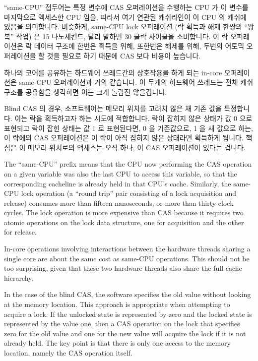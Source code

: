 ``same-CPU'' 접두어는 특정 변수에 CAS 오퍼레이션을 수행하는 CPU 가 이 변수를
마지막으로 액세스한 CPU 임을, 따라서 여기 연관된 캐쉬라인이 이 CPU 의 캐쉬에
있음을 의미합니다.
비슷하게, same-CPU lock 오퍼레이션 (락 획득과 해제 한쌍의 ``왕복'' 작업) 은 15
나노세컨드, 달리 말하면 30 클락 사이클을 소비합니다.
이 락 오퍼레이션은 락 데이터 구조에 한번은 획득을 위해, 또한번은 해제를 위해,
두번의 어토믹 오퍼레이션을 할 것을 필요로 하기 때문에 CAS 보다 비용이 높습니다.

하나의 코어를 공유하는 하드웨어 쓰레드간의 상호작용을 하게 되는 in-core
오퍼레이션은 same-CPU 오퍼레이션과 거의 같습니다.
이 두개의 하드웨어 쓰레드는 전체 캐쉬 구조를 공유함을 생각하면 이는 크게 놀랍진
않을겁니다.

Blind CAS 의 경우, 소프트웨어는 메모리 위치를 고려치 않은 채 기존 값을
특정합니다.
이는 락을 획득하고자 하는 시도에 적합합니다.
락이 잡히지 않은 상태가 값 0 으로 표현되고 락이 잡힌 상태는 값 1 로 표현된다면,
0 을 기존값으로, 1 을 새 값으로 하는, 이 락에의 CAS 오퍼레이션은 이 락이 아직
잡히지 않은 상태라면 획득하게 됩니다.
핵심은 이 메모리 위치로의 액세스는 오직 하나, 이 CAS 오퍼레이션이 있다는
겁니다.

\iffalse

The ``same-CPU'' prefix means that the CPU now performing the CAS operation
on a given variable was also the last CPU to access this variable, so
that the corresponding cacheline is already held in that CPU's cache.
Similarly, the same-CPU lock operation (a ``round trip'' pair consisting
of a lock acquisition and release) consumes more than fifteen nanoseconds,
or more than thirty clock cycles.
The lock operation is more expensive than CAS because it requires two
atomic operations on the lock data structure, one for acquisition and
the other for release.

In-core operations involving interactions between the hardware threads
sharing a single core are about the same cost as same-CPU operations.
This should not be too surprising, given that these two hardware threads
also share the full cache hierarchy.

In the case of the blind CAS, the software specifies the old value
without looking at the memory location.
This approach is appropriate when attempting to acquire a lock.
If the unlocked state is represented by zero and the locked state
is represented by the value one, then a CAS operation on the lock
that specifies zero for the old value and one for the new value
will acquire the lock if it is not already held.
The key point is that there is only one access to the memory
location, namely the CAS operation itself.


